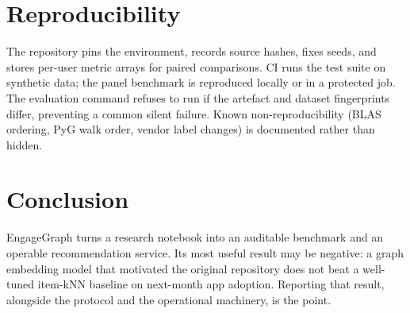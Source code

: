 \documentclass[11pt]{article}
\begin{document}
\section{Reproducibility}

The repository pins the environment, records source hashes, fixes seeds, and stores per-user metric arrays for paired comparisons. CI runs the test suite on synthetic data; the panel benchmark is reproduced locally or in a protected job. The evaluation command refuses to run if the artefact and dataset fingerprints differ, preventing a common silent failure. Known non-reproducibility (BLAS ordering, PyG walk order, vendor label changes) is documented rather than hidden.

\section{Conclusion}

EngageGraph turns a research notebook into an auditable benchmark and an operable recommendation service. Its most useful result may be negative: a graph embedding model that motivated the original repository does not beat a well-tuned item-kNN baseline on next-month app adoption. Reporting that result, alongside the protocol and the operational machinery, is the point.



\end{document}
